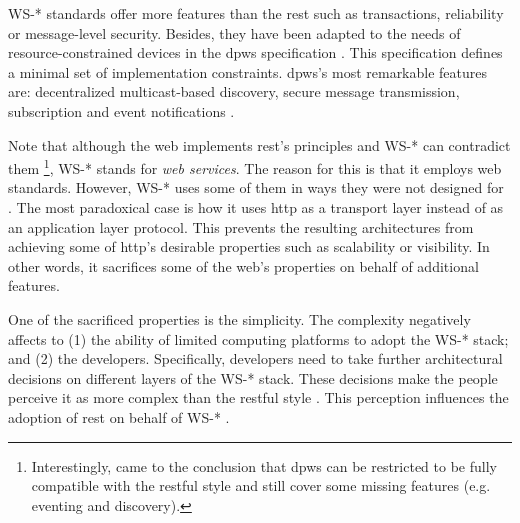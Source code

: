 WS-* standards offer more features than the \ac{rest} such as transactions, reliability or message-level security.
Besides, they have been adapted to the needs of resource-constrained devices in the \ac{dpws} specification .
This specification defines a minimal set of implementation constraints.
\ac{dpws}'s most remarkable features are: decentralized multicast-based discovery, secure message transmission, subscription and event notifications \citep{moritz_devices_2010}.


Note that although the web implements \ac{rest}'s principles and WS-* can contradict them
\footnote{Interestingly, \citet{moritz_devices_2010} came to the conclusion that \ac{dpws} can be restricted to be fully compatible with the \ac{rest}ful style and still cover some missing features (e.g. eventing and discovery).},
WS-* stands for \emph{web services}. %
The reason for this is that it employs web standards. %
However, WS-* uses some of them in ways they were not designed for \citep{krummenacher_www_2005}.
The most paradoxical case is how it uses \ac{http} as a transport layer instead of as an application layer protocol.
This prevents the resulting architectures from achieving some of \ac{http}'s desirable properties such as scalability or visibility.
In other words, it sacrifices some of the web's properties on behalf of additional features.


One of the sacrificed properties is the simplicity.
The complexity negatively affects to
(1) the ability of limited computing platforms to adopt the WS-* stack; and %
(2) the developers.
Specifically, developers need to take further architectural decisions on different layers of the WS-* stack.
These decisions make the people perceive it as more complex than the \ac{rest}ful style \citep{guinard_search_2011}.
This perception influences the adoption of \ac{rest} on behalf of WS-* \citep{davis_perceived_1989,legris_why_2003}.


